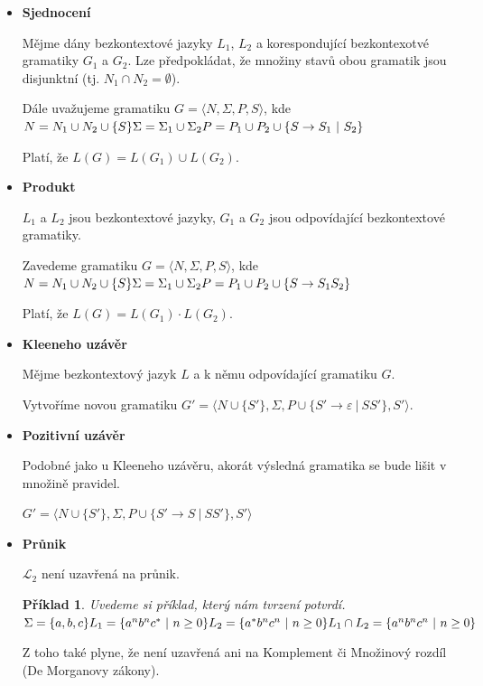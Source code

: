\documentclass[10pt, a4paper, titlepage]{article}
\theoremstyle{note}
\newtheorem{priklad}{Příklad}
\begin{document}
\begin{itemize}
\item
\textbf{Sjednocení}

Mějme dány bezkontextové jazyky $L_1$, $L_2$ a korespondující bezkontexotvé gramatiky $G_1$ a $G_2$. Lze předpokládat, že množiny stavů obou gramatik jsou disjunktní (tj. $N_1 \cap N_2 = \emptyset$).

Dále uvažujeme gramatiku $G = \langle N,\Sigma,P,S \rangle$, kde \\
$N=N_1 \cup N_2 \cup \lbrace S \rbrace \\
\Sigma = \Sigma_1 \cup \Sigma_2 \\
P = P_1 \cup P_2 \cup \lbrace S \rightarrow S_1\ |\ S_2 \rbrace$

Platí, že $L(G)=L(G_1) \cup L(G_2)$.

\item
\textbf{Produkt}

$L_1$ a $L_2$ jsou bezkontextové jazyky, $G_1$ a $G_2$ jsou odpovídající bezkontextové gramatiky.

Zavedeme gramatiku $G = \langle N,\Sigma,P,S \rangle$, kde \\
$N=N_1 \cup N_2 \cup \lbrace S \rbrace \\
\Sigma = \Sigma_1 \cup \Sigma_2 \\
P = P_1 \cup P_2 \cup \lbrace S \rightarrow S_1S_2 \rbrace$

Platí, že $L(G) = L(G_1) \cdot L(G_2)$.

\item
\textbf{Kleeneho uzávěr}

Mějme bezkontextový jazyk $L$ a k němu odpovídající gramatiku $G$.

Vytvoříme novou gramatiku $G' = \langle N \cup \lbrace S' \rbrace,\Sigma,P \cup \lbrace S' \rightarrow \varepsilon\ |\ SS'\rbrace,S' \rangle$.

\item
\textbf{Pozitivní uzávěr}

Podobné jako u Kleeneho uzávěru, akorát výsledná gramatika se bude lišit v množině pravidel.

$G' = \langle N \cup \lbrace S' \rbrace,\Sigma,P \cup \lbrace S' \rightarrow S\ |\ SS'\rbrace,S' \rangle$

\item
\textbf{Průnik}

$\mathcal{L}_2$ není uzavřená na průnik.

\begin{priklad}
Uvedeme si příklad, který nám tvrzení potvrdí.\\
$\Sigma = \lbrace a,b,c \rbrace \\
L_1 = \lbrace a^nb^nc^*\ |\ n \ge 0 \rbrace \\
L_2 = \lbrace a^*b^nc^n\ |\ n \ge 0 \rbrace \\
\\
L_1 \cap L_2 = \lbrace a^nb^nc^n\ |\ n \ge 0 \rbrace$
\end{priklad}
Z toho také plyne, že není uzavřená ani na Komplement či Množinový rozdíl (De Morganovy zákony).
\end{itemize}
\end{document}
